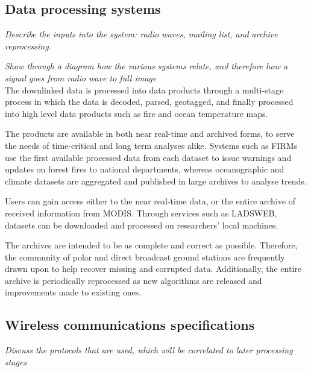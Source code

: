 
\subsection{Data processing systems}

\textit{Describe the inputs into the system: radio waves, mailing list, and archive reprocessing}.

\textit{Show through a diagram how the various systems relate, and therefore how a signal goes from radio wave to full image} \\

The downlinked data is processed into data products through a multi-stage process in which the data is decoded, parsed, geotagged, and finally processed into high level data products such as fire and ocean temperature maps.

The products are available in both near real-time and archived forms, to serve the needs of time-critical and long term analyses alike.
Systems such as FIRMs use the first available processed data from each dataset to issue warnings and updates on forest fires to national departments, whereas oceanographic and climate datasets are aggregated and published in large archives to analyse trends.

Users can gain access either to the near real-time data, or the entire archive of received information from MODIS.  Through services such as LADSWEB, datasets can be downloaded and processed on researchers' local machines.

The archives are intended to be as complete and correct as possible.
Therefore, the community of polar and direct broadcast ground stations are frequently drawn upon to help recover missing and corrupted data.
Additionally, the entire archive is periodically reprocessed as new algorithms are released and improvements made to existing ones.


\subsection{Wireless communications specifications}
\textit{Discuss the protocols that are used, which will be correlated to later processing stages}


